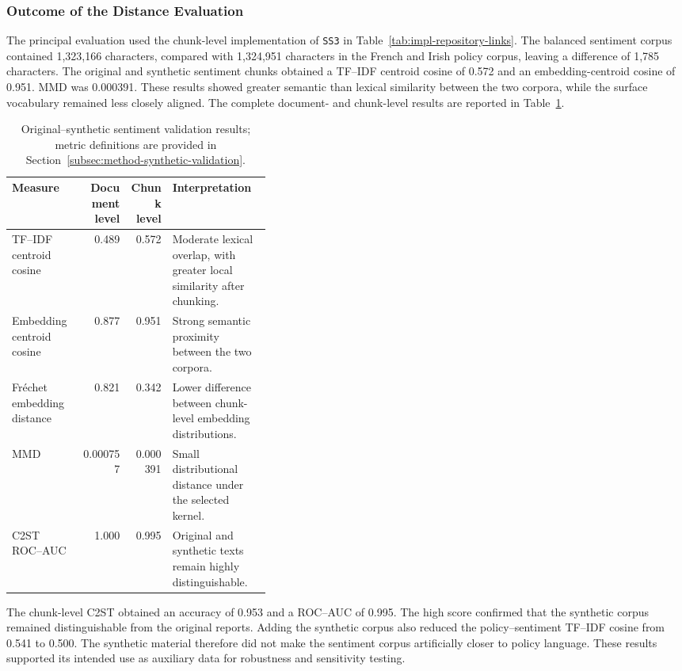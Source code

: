 \subsubsection*{Outcome of the Distance Evaluation}

The principal evaluation used the chunk-level implementation of \texttt{SS3} in
Table~\ref{tab:impl-repository-links}. The balanced sentiment corpus contained
1,323,166 characters, compared with 1,324,951 characters in the French and Irish
policy corpus, leaving a difference of 1,785 characters.
The original and synthetic sentiment chunks obtained a TF--IDF centroid cosine of
0.572 and an embedding-centroid cosine of 0.951. MMD was 0.000391. These results
showed greater semantic than lexical similarity between the two corpora, while the
surface vocabulary remained less closely aligned. The complete document- and
chunk-level results are reported in
Table~\ref{tab:impl-synthetic-validation}.

\begin{table}[!htbp]
\centering
\small
\setlength{\tabcolsep}{4pt}
\renewcommand{\arraystretch}{1.03}
\begin{tabular}{lrr>{\raggedright\arraybackslash}p{0.38\linewidth}}
\hline
Measure & Document level & Chunk level & Interpretation \\
\hline
TF--IDF centroid cosine
& 0.489
& 0.572
& Moderate lexical overlap, with greater local similarity after chunking. \\

Embedding centroid cosine
& 0.877
& 0.951
& Strong semantic proximity between the two corpora. \\

Fr\'echet embedding distance
& 0.821
& 0.342
& Lower difference between chunk-level embedding distributions. \\

MMD
& 0.000757
& 0.000391
& Small distributional distance under the selected kernel. \\

C2ST ROC--AUC
& 1.000
& 0.995
& Original and synthetic texts remain highly distinguishable. \\
\hline
\end{tabular}
\caption{Original--synthetic sentiment validation results; metric definitions are
provided in Section~\ref{subsec:method-synthetic-validation}.}
\label{tab:impl-synthetic-validation}
\end{table}

The chunk-level C2ST obtained an accuracy of 0.953 and a ROC--AUC of 0.995. The high
score confirmed that the synthetic corpus remained distinguishable from the original
reports. Adding the
synthetic corpus also reduced the policy--sentiment TF--IDF cosine from 0.541 to
0.500. The synthetic material therefore did not make the sentiment corpus
artificially closer to policy language. These results supported its intended use as
auxiliary data for robustness and sensitivity testing.

